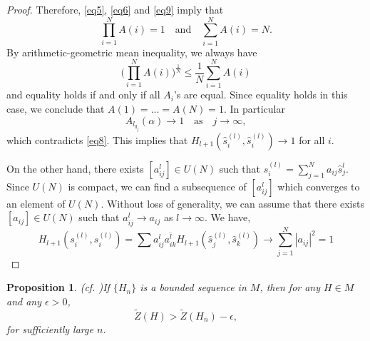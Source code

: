 \documentclass[12pt,oneside,notitlepage]{amsart}
\newtheorem{prop}[thm]{Proposition}
\theoremstyle{definition}
\theoremstyle{remark}
\numberwithin{equation}{section}
\begin{document}
\begin{proof}
Therefore, \eqref{eq5}, \eqref{eq6} and \eqref{eq9} imply that
$$\prod_{i=1}^{N } A(i)=1  \,\,\,\,  \textrm{   and   }  \,\,\,\,   \sum _{i=1}^{N } A(i)=N.$$
By arithmetic-geometric mean inequality, we always have
$$\big(\prod_{i=1}^{N} A(i) \big)^{\frac{1}{N}} \leq  \frac{1}{N} \sum _{i=1}^{N } A(i)$$
and equality holds if and only if all $A_{i}$'s are equal. Since
equality holds in this case, we conclude that $A(1)=...=A(N)=1.$
In particular
$$A_{l_{q_{j}}}(\alpha) \rightarrow 1    \,\,\,\, \textrm{    as    }  \,\,\,\,
j\rightarrow \infty,$$ which contradicts \eqref{eq8}. This implies
that $H_{l+1}(\hat{s}_{i}^{(l)}, \hat{s}_{i}^{(l)} )\rightarrow 1$
for all $i$.

On the other hand, there exists $[a_{ij}^l]\in U(N)$ such that
$s_{i}^{(l)}=\sum_{j=1}^{N} a_{ij} \hat{s}_{j}^{l}$. Since $U(N)$
is compact, we can find a subsequence of $[a_{ij}^l]$ which
converges to an element of $U(N)$. Without loss of generality, we
can assume that there exists $[a_{ij}] \in U(N)$ such that
$a_{ij}^{l} \rightarrow a_{ij}$ as $l \rightarrow \infty$. We
have,
$$H_{l+1}(s_{i}^{(l)}, s_{i}^{(l)} )=\sum a_{ij}^l\overline{a_{ik}^l}H_{l+1}(\hat{s}_{j}^{(l)},
\hat{s}_{k}^{(l)} )\rightarrow \sum_{j=1}^{N} |a_{ij}|^2 =1$$

\end{proof}

\begin{prop}(cf. \cite [Proposition ]{S})\label{secondprop}
If $\{H_{n}\}$ is a bounded sequence in $M$, then for any $H \in
M$ and any $\epsilon
>0$,
\begin{equation}\widetilde{Z}(H)> \widetilde{Z}(H_{n})-\epsilon,
\end{equation}
for sufficiently large $n$.

\end{prop}
\end{document}
